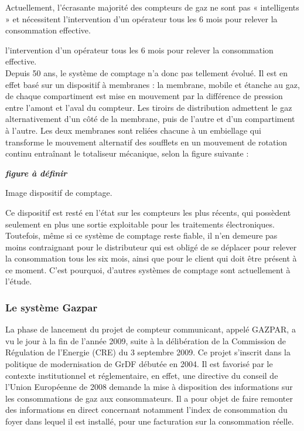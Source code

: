 \documentclass[
12pt,
french,                           %
a4paper,
]{article}
\begin{document}
Actuellement, l'écrasante majorité des compteurs de gaz ne sont pas «
intelligents » et nécessitent l'intervention d'un opérateur tous les 6
mois pour relever la consommation effective.

l'intervention d'un opérateur tous les 6 mois pour relever la
consommation effective.\\Depuis 50 ans, le système de comptage n'a donc
pas tellement évolué. Il est en effet basé sur un dispositif à membranes
: la membrane, mobile et étanche au gaz, de chaque compartiment est mise
en mouvement par la différence de pression entre l'amont et l'aval du
compteur. Les tiroirs de distribution admettent le gaz alternativement
d'un côté de la membrane, puis de l'autre et d'un compartiment à
l'autre. Les deux membranes sont reliées chacune à un embiellage qui
transforme le mouvement alternatif des soufflets en un mouvement de
rotation continu entraînant le totaliseur mécanique, selon la figure
suivante :

\textbf{\emph{figure à définir}}

Image dispositif de comptage.

Ce dispositif est resté en l'état sur les compteurs les plus récents,
qui possèdent seulement en plus une sortie exploitable pour les
traitements électroniques. Toutefois, même si ce système de comptage
reste fiable, il n'en demeure pas moins contraignant pour le
distributeur qui est obligé de se déplacer pour relever la consommation
tous les six mois, ainsi que pour le client qui doit être présent à ce
moment. C'est pourquoi, d'autres systèmes de comptage sont actuellement
à l'étude.

\subsubsection{Le système Gazpar}

La phase de lancement du projet de compteur communicant, appelé GAZPAR,
a vu le jour à la fin de l'année 2009, suite à la délibération de la
Commission de Régulation de l'Energie (CRE) du 3 septembre 2009. Ce
projet s'inscrit dans la politique de modernisation de GrDF débutée en
2004. Il est favorisé par le contexte institutionnel et réglementaire,
en effet, une directive du conseil de l'Union Européenne de 2008 demande
la mise à disposition des informations sur les consommations de gaz aux
consommateurs. Il a pour objet de faire remonter des informations en
direct concernant notamment l'index de consommation du foyer dans lequel
il est installé, pour une facturation sur la consommation réelle.
\end{document}
